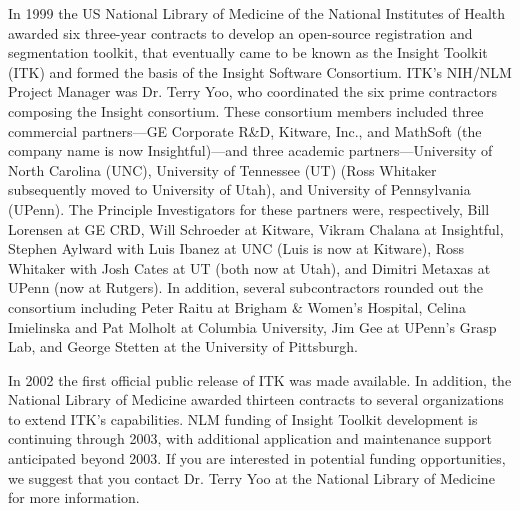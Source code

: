 In 1999 the US National Library of Medicine of the National Institutes of
Health awarded six three-year contracts to develop an open-source
registration and segmentation toolkit, that eventually came to be known as
the Insight Toolkit (ITK) and formed the basis of the Insight Software
Consortium. ITK's NIH/NLM Project Manager was Dr. Terry Yoo, who coordinated the
six prime contractors composing the Insight consortium. These consortium
members included three commercial partners---GE Corporate R\&D, Kitware,
Inc., and MathSoft (the company name is now Insightful)---and three academic
partners---University of North Carolina (UNC), University of Tennessee (UT)
(Ross Whitaker subsequently moved to University of Utah), and University of
Pennsylvania (UPenn). The Principle Investigators for these partners were,
respectively, Bill Lorensen at GE CRD, Will Schroeder at Kitware, Vikram
Chalana at Insightful, Stephen Aylward with Luis Ibanez at UNC (Luis is now
at Kitware), Ross Whitaker with Josh Cates at UT (both now at Utah), and
Dimitri Metaxas at UPenn (now at Rutgers). In addition, several
subcontractors rounded out the consortium including Peter Raitu at Brigham \&
Women's Hospital, Celina Imielinska and Pat Molholt at Columbia University,
Jim Gee at UPenn's Grasp Lab, and George Stetten at the University of
Pittsburgh.

In 2002 the first official public release of ITK was made available. In
addition, the National Library of Medicine awarded thirteen contracts to
several organizations to extend ITK's capabilities. NLM funding of 
Insight Toolkit development is continuing through 2003, with additional
application and maintenance support anticipated beyond 2003. If you are 
interested in potential funding opportunities, we suggest that you contact
Dr. Terry Yoo at the National Library of Medicine for more information.
